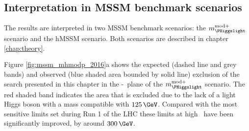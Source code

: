 \subsection{Interpretation in MSSM benchmark scenarios}
\label{sec:mssm_results_modeldep}
The results are interpreted in two MSSM benchmark scenarios: the $m_{\text{\PHiggslight}}^{\text{mod+}}$
scenario and the hMSSM scenario. Both scenarios are described in chapter \ref{chap:theory}.

Figure \ref{fig:mssm_mhmodp_2016}a shows the expected (dashed line and grey bands) and
observed (blue shaded area bounded by solid line) exclusion of the search presented in this chapter
in the \mA-\tanb~plane of the $m_{\PHiggslight}^{\text{mod+}}$ scenario. The red shaded band
indicates the area that is excluded due to the lack of a light Higgs boson with a mass compatible
with $125\,\GeV$. Compared with the most sensitive limits set during Run 1 of the \ac{LHC} these
limits at high \tanb~have been significantly improved, by around $300\,\GeV$.

